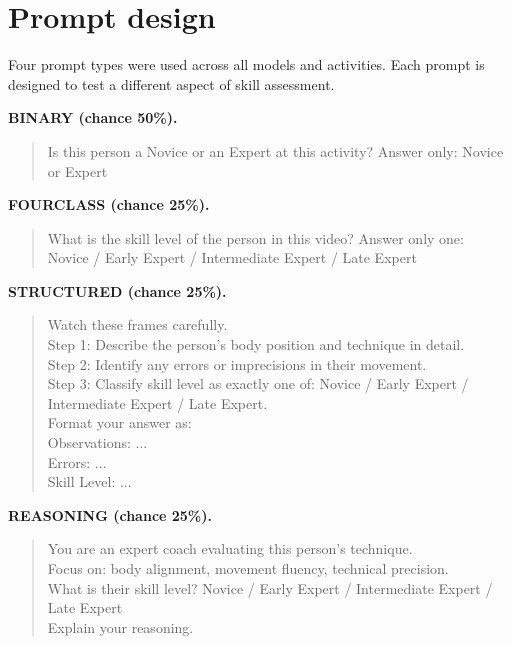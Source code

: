 \documentclass[logo,msc]{infthesis}
\newcommand{\runin}[1]{\par\medskip\noindent\textbf{#1}}
\begin{document}
\section{Prompt design}

Four prompt types were used across all models and activities. Each prompt
is designed to test a different aspect of skill assessment.

\runin{BINARY (chance 50\%).}
\begin{quote}\ttfamily\footnotesize
Is this person a Novice or an Expert at this activity? Answer only:
Novice or Expert
\end{quote}

\runin{FOURCLASS (chance 25\%).}
\begin{quote}\ttfamily\footnotesize
What is the skill level of the person in this video? Answer only one:\\
Novice / Early Expert / Intermediate Expert / Late Expert
\end{quote}

\runin{STRUCTURED (chance 25\%).}
\begin{quote}\ttfamily\footnotesize
Watch these frames carefully.\\
Step 1: Describe the person's body position and technique in detail.\\
Step 2: Identify any errors or imprecisions in their movement.\\
Step 3: Classify skill level as exactly one of: Novice / Early Expert /
Intermediate Expert / Late Expert.\\
Format your answer as:\\
Observations: ...\\
Errors: ...\\
Skill Level: ...
\end{quote}

\runin{REASONING (chance 25\%).}
\begin{quote}\ttfamily\footnotesize
You are an expert coach evaluating this person's technique.\\
Focus on: body alignment, movement fluency, technical precision.\\
What is their skill level? Novice / Early Expert / Intermediate Expert /
Late Expert\\
Explain your reasoning.
\end{quote}
\end{document}
